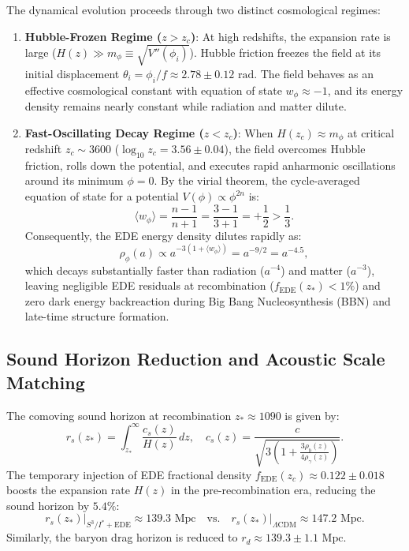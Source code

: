 \documentclass[11pt,a4paper]{article}
\theoremstyle{definition}
\newcommand{\LCDM}{\Lambda\mathrm{CDM}}
\newcommand{\EDE}{\mathrm{EDE}}
\begin{document}
The dynamical evolution proceeds through two distinct cosmological regimes:
\begin{enumerate}
    \item \textbf{Hubble-Frozen Regime ($z > z_c$)}: At high redshifts, the expansion rate is large ($H(z) \gg m_\phi \equiv \sqrt{V''(\phi_i)}$). Hubble friction freezes the field at its initial displacement $\theta_i = \phi_i / f \approx 2.78 \pm 0.12\text{ rad}$. The field behaves as an effective cosmological constant with equation of state $w_\phi \approx -1$, and its energy density remains nearly constant while radiation and matter dilute.
    \item \textbf{Fast-Oscillating Decay Regime ($z < z_c$)}: When $H(z_c) \approx m_\phi$ at critical redshift $z_c \sim 3600$ ($\log_{10} z_c = 3.56 \pm 0.04$), the field overcomes Hubble friction, rolls down the potential, and executes rapid anharmonic oscillations around its minimum $\phi = 0$. By the virial theorem, the cycle-averaged equation of state for a potential $V(\phi) \propto \phi^{2n}$ is:
    \begin{equation}
    \langle w_\phi \rangle = \frac{n - 1}{n + 1} = \frac{3 - 1}{3 + 1} = +\frac{1}{2} > \frac{1}{3}.
    \end{equation}
    Consequently, the EDE energy density dilutes rapidly as:
    \begin{equation}
    \rho_\phi(a) \propto a^{-3(1 + \langle w_\phi \rangle)} = a^{-9/2} = a^{-4.5},
    \end{equation}
    which decays substantially faster than radiation ($a^{-4}$) and matter ($a^{-3}$), leaving negligible EDE residuals at recombination ($f_{\EDE}(z_*) < 1\%$) and zero dark energy backreaction during Big Bang Nucleosynthesis (BBN) and late-time structure formation.
\end{enumerate}

\subsection{Sound Horizon Reduction and Acoustic Scale Matching}

The comoving sound horizon at recombination $z_* \approx 1090$ is given by:
\begin{equation}
r_s(z_*) = \int_{z_*}^\infty \frac{c_s(z)}{H(z)}\,dz, \quad c_s(z) = \frac{c}{\sqrt{3 \left(1 + \frac{3\rho_b(z)}{4\rho_\gamma(z)}\right)}}.
\end{equation}
The temporary injection of EDE fractional density $f_{\EDE}(z_c) \approx 0.122 \pm 0.018$ boosts the expansion rate $H(z)$ in the pre-recombination era, reducing the sound horizon by $5.4\%$:
\begin{equation}
\left. r_s(z_*) \right|_{S^3 / I^* + \EDE} \approx 139.3\text{ Mpc} \quad \text{vs.} \quad \left. r_s(z_*) \right|_{\LCDM} \approx 147.2\text{ Mpc}.
\end{equation}
Similarly, the baryon drag horizon is reduced to $r_d \approx 139.3 \pm 1.1\text{ Mpc}$.
\end{document}
